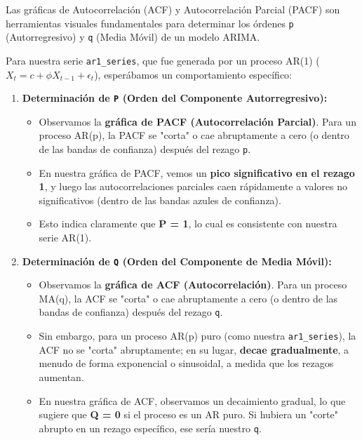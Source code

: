 \documentclass[
  11pt,
]{article}
\providecommand{\tightlist}{%
  \setlength{\itemsep}{0pt}\setlength{\parskip}{0pt}}
\begin{document}
Las gráficas de Autocorrelación (ACF) y Autocorrelación Parcial (PACF) son herramientas visuales fundamentales para determinar los órdenes \texttt{p} (Autorregresivo) y \texttt{q} (Media Móvil) de un modelo ARIMA.

Para nuestra serie \texttt{ar1\_series}, que fue generada por un proceso AR(1) (\(X_t = c + \phi X_{t-1} + \epsilon_t\)), esperábamos un comportamiento específico:

\begin{enumerate}
\def\labelenumi{\arabic{enumi}.}
\item
  \textbf{Determinación de \texttt{P} (Orden del Componente Autorregresivo):}

  \begin{itemize}
  \tightlist
  \item
    Observamos la \textbf{gráfica de PACF (Autocorrelación Parcial)}. Para un proceso AR(p), la PACF se "corta" o cae abruptamente a cero (o dentro de las bandas de confianza) después del rezago \texttt{p}.
  \item
    En nuestra gráfica de PACF, vemos un \textbf{pico significativo en el rezago 1}, y luego las autocorrelaciones parciales caen rápidamente a valores no significativos (dentro de las bandas azules de confianza).
  \item
    Esto indica claramente que \textbf{P = 1}, lo cual es consistente con nuestra serie AR(1).
  \end{itemize}
\item
  \textbf{Determinación de \texttt{Q} (Orden del Componente de Media Móvil):}

  \begin{itemize}
  \tightlist
  \item
    Observamos la \textbf{gráfica de ACF (Autocorrelación)}. Para un proceso MA(q), la ACF se "corta" o cae abruptamente a cero (o dentro de las bandas de confianza) después del rezago \texttt{q}.
  \item
    Sin embargo, para un proceso AR(p) puro (como nuestra \texttt{ar1\_series}), la ACF no se "corta" abruptamente; en su lugar, \textbf{decae gradualmente}, a menudo de forma exponencial o sinusoidal, a medida que los rezagos aumentan.
  \item
    En nuestra gráfica de ACF, observamos un decaimiento gradual, lo que sugiere que \textbf{Q = 0} si el proceso es un AR puro. Si hubiera un "corte" abrupto en un rezago específico, ese sería nuestro \texttt{q}.
  \end{itemize}
\end{enumerate}
\end{document}
